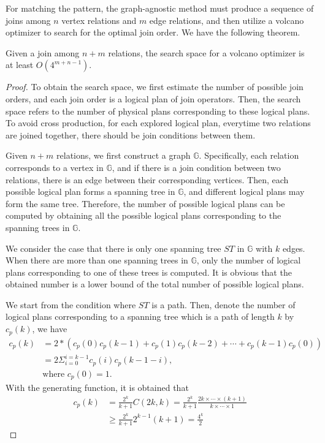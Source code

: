 For matching the pattern, the graph-agnostic method must produce a sequence of joins among $n$ vertex relations and $m$ edge relations, and then utilize a volcano optimizer to search for the optimal join order. We have the following theorem.

\begin{theorem}
    \label{thm:complexity-of-volcano}
    Given a join among $n + m$ relations, the search space for a volcano optimizer is at least $O(4^{m+n-1})$.
\end{theorem}

\begin{proof}
    To obtain the search space, we first estimate the number of possible join orders, and each join order is a logical plan of join operators.
    Then, the search space refers to the number of physical plans corresponding to these logical plans.
    To avoid cross production, for each explored logical plan, everytime two relations are joined together, there should be join conditions between them.

    Given $n + m$ relations, we first construct a graph $\mathbb{G}$.
    Specifically, each relation corresponds to a vertex in $\mathbb{G}$, and if there is a join condition between two relations, there is an edge between their corresponding vertices.
    Then, each possible logical plan forms a spanning tree in $\mathbb{G}$, and different logical plans may form the same tree.
    Therefore, the number of possible logical plans can be computed by obtaining all the possible logical plans corresponding to the spanning trees in $\mathbb{G}$.

    We consider the case that there is only one spanning tree $ST$ in $\mathbb{G}$ with $k$ edges.
    When there are more than one spanning trees in $\mathbb{G}$, only the number of logical plans corresponding to one of these trees is computed.
    It is obvious that the obtained number is a lower bound of the total number of possible logical plans.

    We start from the condition where $ST$ is a path.
    Then, denote the number of logical plans corresponding to a spanning tree which is a path of length $k$ by $c_p(k)$, we have 
    \begin{equation*}
        \begin{split}
            c_p(k) & = 2 * (c_p(0)c_p(k-1) + c_p(1)c_p(k-2) + \cdots + c_p(k-1)c_p(0)) \\
            & = 2\Sigma_{i=0}^{i=k-1}c_p(i)c_p(k-1-i), \\
            & \text{where } c_p(0) = 1.
        \end{split}
    \end{equation*}
    With the generating function, it is obtained that
    \begin{equation*}
        \begin{split}
            c_p(k) & = \frac{2^k}{k+1}C(2k, k) = \frac{2^k}{k+1}\frac{2k \times \cdots \times (k+1)}{k \times \cdots \times 1} \\
            & \geq \frac{2^k}{k+1}2^{k-1}(k+1) = \frac{4^k}{2}
        \end{split}
    \end{equation*}


\end{proof}
